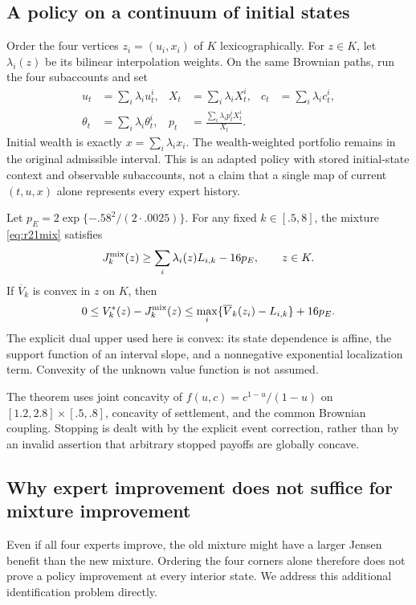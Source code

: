 \subsection{A policy on a continuum of initial states}
Order the four vertices $z_i=(u_i,x_i)$ of $K$ lexicographically. For $z\in K$, let $\lambda_i(z)$ be its bilinear interpolation weights. On the same Brownian paths, run the four subaccounts and set
\begin{align}
 u_t&=\sum_i\lambda_i u^i_t,&
 X_t&=\sum_i\lambda_i X^i_t,&
 c_t&=\sum_i\lambda_i c^i_t,\nonumber\\
 \theta_t&=\sum_i\lambda_i\theta^i_t,&
 p_t&=\frac{\sum_i\lambda_i p^i_t X^i_t}{X_t}.&&\label{eq:r21mix}
\end{align}
Initial wealth is exactly $x=\sum_i\lambda_i x_i$. The wealth-weighted portfolio remains in the original admissible interval. This is an adapted policy with stored initial-state context and observable subaccounts, not a claim that a single map of current $(t,u,x)$ alone represents every expert history.

\begin{theorem}\label{thm:r21transfer}
Let $p_E=2\exp\{- .58^2/(2\cdot .0025)\}$. For any fixed $k\in[.5,8]$, the mixture \eqref{eq:r21mix} satisfies
\begin{equation}
 J_k^{\rm mix}(z)\geq\sum_i\lambda_i(z)L_{i,k}-16p_E,
 \qquad z\in K.\label{eq:r21mixlower}
\end{equation}
If $\overline V_k$ is convex in $z$ on $K$, then
\begin{equation}
 0\leq V_k^*(z)-J_k^{\rm mix}(z)
 \leq \max_i\{\overline V_k(z_i)-L_{i,k}\}+16p_E.
 \label{eq:r21mixregret}
\end{equation}
The explicit dual upper used here is convex: its state dependence is affine, the support function of an interval slope, and a nonnegative exponential localization term. Convexity of the unknown value function is not assumed.
\end{theorem}
The theorem uses joint concavity of $f(u,c)=c^{1-u}/(1-u)$ on $[1.2,2.8]\times[.5,.8]$, concavity of settlement, and the common Brownian coupling. Stopping is dealt with by the explicit event correction, rather than by an invalid assertion that arbitrary stopped payoffs are globally concave.

\subsection{Why expert improvement does not suffice for mixture improvement}
Even if all four experts improve, the old mixture might have a larger Jensen benefit than the new mixture. Ordering the four corners alone therefore does not prove a policy improvement at every interior state. We address this additional identification problem directly.

